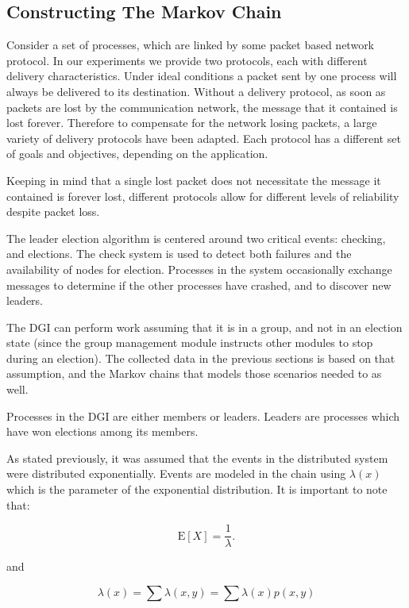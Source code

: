 \subsection{Constructing The Markov Chain}

Consider a set of processes, which are linked by some packet based network
protocol. In our experiments we provide two protocols, each with different
delivery characteristics. Under ideal conditions a packet sent by one process
will always be delivered to its destination. Without a delivery protocol, as
soon as packets are lost by the communication network, the message that it
contained is lost forever. Therefore to compensate for the network losing
packets, a large variety of delivery protocols have been adapted. Each protocol
has a different set of goals and objectives, depending on the application.

Keeping in mind that a single lost packet does not necessitate the message it
contained is forever lost, different protocols allow for different levels of
reliability despite packet loss.

The leader election algorithm is centered around two critical events: checking,
and elections. The check system is used to detect both failures and the
availability of nodes for election. Processes in the system occasionally exchange 
messages to determine if the other processes have crashed, and to discover new
leaders. 

The DGI can perform work assuming that it is in a group, and not in an election
state (since the group management module instructs other modules to stop during
an election). The collected data in the previous sections is based on that
assumption, and the Markov chains that models those scenarios needed to as
well.

Processes in the DGI are either members or leaders. Leaders are processes
which have won elections among its members.

As stated previously, it was assumed that the events in the distributed system
were distributed exponentially. Events are modeled in the chain
using $\lambda(x)$ which is the parameter of the exponential distribution. It
is important to note that:

\begin{equation}
\mathrm{E}[X] = \frac{1}{\lambda}. \!
\end{equation}

and

\begin{equation}
\lambda(x) = \sum \lambda(x,y) = \sum \lambda(x) p(x,y)
\end{equation}

